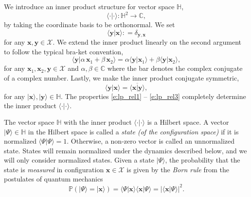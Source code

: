 \documentclass[a4paper,11pt]{article}
\theoremstyle{definition}
\begin{document}
We introduce an inner product structure for vector space $\mathbb{H}$,
\begin{equation}
    \langle \cdot | \cdot \rangle: \mathbb{H}^2 \rightarrow \mathbb{C},
\end{equation}
by taking the coordinate basis to be orthonormal. We set 
\begin{equation}\label{e:lp_rel1}
    \langle \mathbf{y} | \mathbf{x} \rangle : = \delta_{\mathbf{y}, \mathbf{x}}
\end{equation}
for any $\mathbf{x}, \mathbf{y} \in \mathcal{X}$. We extend the inner product linearly on the second argument to follow the typical bra-ket convention,
\begin{equation}\label{e:lp_rel2}
    \langle \mathbf{y} | \alpha \,\mathbf{x}_1 + \beta \, \mathbf{x}_2 \rangle = \alpha\langle \mathbf{y} | \mathbf{x}_1 \rangle +\beta \langle \mathbf{y} | \mathbf{x}_2 \rangle,
\end{equation}
for any $\mathbf{x}_1, \mathbf{x}_2, \mathbf{y} \in \mathcal{X}$ and $\alpha, \beta \in \mathbb{C}$ where the bar denotes the complex conjugate of a complex number. Lastly, we make the inner product conjugate symmetric,
\begin{equation}\label{e:lp_rel3}
    \langle \mathbf{y} | \mathbf{x} \rangle = \overline{\langle \mathbf{x} | \mathbf{y} \rangle},
\end{equation}
for any $|\mathbf{x}\rangle , |\mathbf{y}\rangle \in \mathbb{H}$. The properties \eqref{e:lp_rel1} -- \eqref{e:lp_rel3} completely determine the inner product $\langle \cdot | \cdot \rangle$. 

The vector space $\mathbb{H}$ with the inner product $\langle \cdot | \cdot \rangle$ is a Hilbert space. A vector $ | \Psi \rangle \in \mathbb{H}$ in the Hilbert space is called a \emph{state (of the configuration space)} if it is normalized $\langle \Psi | \Psi \rangle =1$. Otherwise, a non-zero vector is called an unnormalized state. States will remain normalized under the dynamics described below, and we will only consider normalized states. Given a state $|\Psi \rangle$, the probability that the state is \emph{measured} in configuration $\mathbf{x} \in \mathcal{X}$ is given by the \emph{Born rule} from the postulates of quantum mechanics
\begin{equation}\label{e:prob}
    \mathbb{P}(|\Psi \rangle = | \mathbf{x} \rangle) = \langle \Psi | \mathbf{x} \rangle \langle \mathbf{x} | \Psi \rangle = \vert \langle \mathbf{x} | \Psi \rangle \vert^2.
\end{equation}
\end{document}
